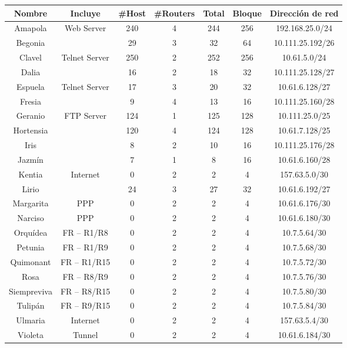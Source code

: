 \begin{table}[!htbp]
  \begin{tabular}{|c|c|c|c|c|c|c|}
    \hline
	Nombre & Incluye & \#Host & \#Routers & Total & Bloque & Dirección de red \\ \hline
	Amapola & Web Server & 240 & 4 & 244 & 256 & 192.168.25.0/24 \\ \hline
	Begonia & ~ & 29 & 3 & 32 & 64 & 10.111.25.192/26 \\ \hline
	Clavel & Telnet Server & 250 & 2 & 252 & 256 & 10.61.5.0/24 \\ \hline
	Dalia & ~ & 16 & 2 & 18 & 32 & 10.111.25.128/27 \\ \hline
	Espuela & Telnet Server & 17 & 3 & 20 & 32 & 10.61.6.128/27 \\ \hline
	Fresia & ~ & 9 & 4 & 13 & 16 & 10.111.25.160/28 \\ \hline
	Geranio & FTP Server & 124 & 1 & 125 & 128 & 10.111.25.0/25 \\ \hline
	Hortensia & ~ & 120 & 4 & 124 & 128 & 10.61.7.128/25 \\ \hline
	Iris & ~ & 8 & 2 & 10 & 16 & 10.111.25.176/28 \\ \hline
	Jazmín & ~ & 7 & 1 & 8 & 16 & 10.61.6.160/28 \\ \hline
	Kentia & Internet & 0 & 2 & 2 & 4 & 157.63.5.0/30 \\ \hline
	Lirio & ~ & 24 & 3 & 27 & 32 & 10.61.6.192/27 \\ \hline
	Margarita & PPP & 0 & 2 & 2 & 4 & 10.61.6.176/30 \\ \hline
	Narciso & PPP & 0 & 2 & 2 & 4 & 10.61.6.180/30 \\ \hline
	Orquídea & FR – R1/R8 & 0 & 2 & 2 & 4 & 10.7.5.64/30 \\ \hline
	Petunia & FR – R1/R9 & 0 & 2 & 2 & 4 & 10.7.5.68/30 \\ \hline
	Quimonant & FR – R1/R15 & 0 & 2 & 2 & 4 & 10.7.5.72/30 \\ \hline
	Rosa & FR – R8/R9 & 0 & 2 & 2 & 4 & 10.7.5.76/30 \\ \hline
	Siempreviva & FR – R8/R15 & 0 & 2 & 2 & 4 & 10.7.5.80/30 \\ \hline
	Tulipán & FR – R9/R15 & 0 & 2 & 2 & 4 & 10.7.5.84/30 \\ \hline
	Ulmaria & Internet & 0 & 2 & 2 & 4 & 157.63.5.4/30 \\ \hline
	Violeta & Tunnel & 0 & 2 & 2 & 4 & 10.61.6.184/30 \\	
    \hline
  \end{tabular}
	\label{tab002}
\end{table}


